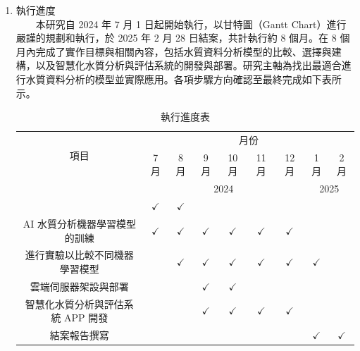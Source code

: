 \documentclass[12pt,a4paper]{article}
\begin{document}
\begin{enumerate}
\begin{enumerate}[label=\arabic*.]
\item 執行進度\\
　　本研究自 2024 年 7 月 1 日起開始執行，以甘特圖（Gantt Chart）進行嚴謹的規劃和執行，於 2025 年 2 月 28 日結案，共計執行約 8 個月。在 8 個月內完成了實作目標與相關內容，包括水質資料分析模型的比較、選擇與建構，以及智慧化水質分析與評估系統的開發與部署。研究主軸為找出最適合進行水質資料分析的模型並實際應用。各項步驟方向確認至最終完成如下表所示。
    \begin{table}[H]
        \centering
        \caption{執行進度表}
        \begin{tabular}{|c|c|c|c|c|c|c|c|c|}
            \hline
            \multirow{2}{*}{項目} & \multicolumn{8}{c|}{月份} \\
            \cline{2-9}
            & 7 月 & 8 月 & 9 月 & 10 月 & 11 月 & 12 月 & 1 月 & 2 月 \\
            \hline
            \multicolumn{1}{|c|}{\multirow{2}{*}{}} & \multicolumn{6}{c|}{2024} & \multicolumn{2}{c|}{2025} \\
            \hline
            文獻回顧與探討 & $\checkmark$ & $\checkmark$ & & & & & & \\
            \hline
            AI 水質分析機器學習模型的訓練 & $\checkmark$ & $\checkmark$ & $\checkmark$ & $\checkmark$ & $\checkmark$ & $\checkmark$ & & \\
            \hline
            進行實驗以比較不同機器學習模型 & & $\checkmark$ & $\checkmark$ & $\checkmark$ & $\checkmark$ & $\checkmark$ & $\checkmark$ & \\
            \hline
            雲端伺服器架設與部署 & & & $\checkmark$ & $\checkmark$ & & & & \\
            \hline
            智慧化水質分析與評估系統 APP 開發 & & & $\checkmark$ & $\checkmark$ & $\checkmark$ & $\checkmark$ & & \\
            \hline
            結案報告撰寫 & & & & & & & $\checkmark$ & $\checkmark$ \\
            \hline
        \end{tabular}
    \end{table}
\end{enumerate}


\end{enumerate}
\end{document}
